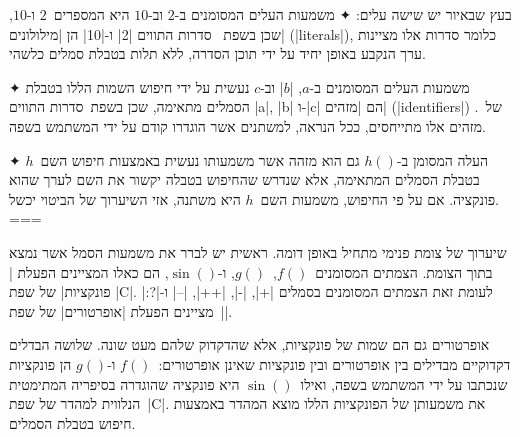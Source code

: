 בעץ שבאיור יש שישה עלים:
✦ משמעות העלים המסומנים ב-$2$ וב-$10$ היא המספרים~$2$ ו-$10$, שכן בשפת~\CPL
סדרות התווים \T|2| ו-\T|10| הן \ע|מילולונים| (\E|literals|), כלומר סדרות אלו
מציינות ערך הנקבע באופן יחיד על ידי תוכן הסדרה, ללא תלות בטבלת סמלים כלשהי.

✦ משמעות העלים המסומנים ב-$a$, \E|$b$| וב-$c$ נעשית על ידי חיפוש השמות הללו
בטבלת הסמלים מתאימה, שכן בשפת~\CPL סדרות התווים \T|a|, \T|b| ו-\T|c| הם
\ע|מזהים| (\E|identifiers|) של~\CPL. מזהים אלו מתייחסים, ככל הנראה, למשתנים אשר
הוגדרו קודם על ידי המשתמש בשפה.

✦ העלה המסומן ב-$h()$ גם הוא מזהה אשר משמעותו נעשית באמצעות חיפוש השם~$h$ בטבלת
הסמלים המתאימה, אלא שנדרש שהחיפוש בטבלה יקשור את השם לערך שהוא פונקציה.
אם על פי החיפוש, משמעות השם~$h$ היא משתנה, אזי השיערוך של הביטוי יכשל.
===

שיערוך של צומת פנימי מתחיל באופן דומה. ראשית יש לברר את משמעות הסמל אשר
נמצא בתוך הצומת. הצמתים המסומנים~$f()$,~$g()$, ו-$\sin()$, הם כאלו המציינים הפעלת
\ע|פונקציות| של שפת \E|C|. לעומת זאת הצמתים המסומנים בסמלים \T|+|, \T|-|,
\T|++|, \T|--| ו-\T|?:| מציינים הפעלת \ע|אופרטורים| של שפת~\E|\CPL|.

אופרטורים גם הם שמות של פונקציות, אלא שהדקדוק שלהם מעט שונה. שלושה הבדלים
דקדוקיים מבדילים בין אופרטורים ובין פונקציות שאינן אופרטורים:~$f()$ ו-$g()$ הן
פונקציות שנכתבו על ידי המשתמש בשפה, ואילו~$\sin()$ היא פונקציה שהוגדרה בסיפריה
המתימטית הנלווית למהדר של שפת~\E|C|. את משמעותן של הפונקציות הללו מוצא המהדר
באמצעות חיפוש בטבלת הסמלים.

